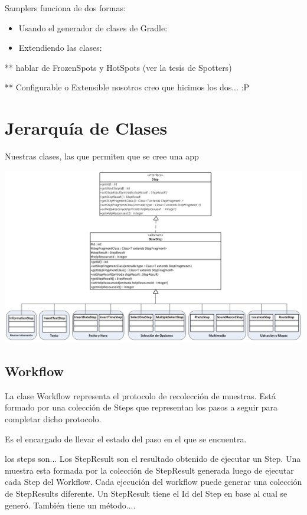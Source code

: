 Samplers funciona de dos formas:
\begin{itemize}
\item Usando el generador de clases de Gradle: 
\item Extendiendo las clases: 
\end{itemize}


** hablar de FrozenSpots y HotSpots (ver la tesis de Spotters)


** Configurable o Extensible nosotros creo que hicimos los dos... :P

\section{Jerarquía de Clases}
Nuestras clases, las que permiten que se cree una app

\includegraphics[scale=0.4]{05-implementacion/Steps.png} 


\subsection{Workflow}
La clase Workflow representa el protocolo de recolección de muestras. Está formado por una colección de Steps que representan los pasos a seguir para completar dicho protocolo.


Es el encargado de llevar el estado del paso en el que se encuentra.



los steps son...
Los StepResult son el resultado obtenido de ejecutar un Step.
Una muestra esta formada por la colección de StepResult generada luego de ejecutar cada Step del Workflow. Cada ejecución del workflow puede generar una colección de StepResults diferente.
Un StepResult tiene el Id del Step en base al cual se generó. También tiene un método....

